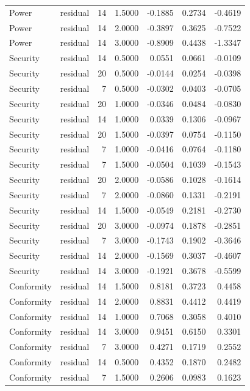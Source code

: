 \begin{tabular}{llrrrrr}
Power & residual & 14 & 1.5000 & -0.1885 & 0.2734 & -0.4619 \\
Power & residual & 14 & 2.0000 & -0.3897 & 0.3625 & -0.7522 \\
Power & residual & 14 & 3.0000 & -0.8909 & 0.4438 & -1.3347 \\
Security & residual & 14 & 0.5000 & 0.0551 & 0.0661 & -0.0109 \\
Security & residual & 20 & 0.5000 & -0.0144 & 0.0254 & -0.0398 \\
Security & residual & 7 & 0.5000 & -0.0302 & 0.0403 & -0.0705 \\
Security & residual & 20 & 1.0000 & -0.0346 & 0.0484 & -0.0830 \\
Security & residual & 14 & 1.0000 & 0.0339 & 0.1306 & -0.0967 \\
Security & residual & 20 & 1.5000 & -0.0397 & 0.0754 & -0.1150 \\
Security & residual & 7 & 1.0000 & -0.0416 & 0.0764 & -0.1180 \\
Security & residual & 7 & 1.5000 & -0.0504 & 0.1039 & -0.1543 \\
Security & residual & 20 & 2.0000 & -0.0586 & 0.1028 & -0.1614 \\
Security & residual & 7 & 2.0000 & -0.0860 & 0.1331 & -0.2191 \\
Security & residual & 14 & 1.5000 & -0.0549 & 0.2181 & -0.2730 \\
Security & residual & 20 & 3.0000 & -0.0974 & 0.1878 & -0.2851 \\
Security & residual & 7 & 3.0000 & -0.1743 & 0.1902 & -0.3646 \\
Security & residual & 14 & 2.0000 & -0.1569 & 0.3037 & -0.4607 \\
Security & residual & 14 & 3.0000 & -0.1921 & 0.3678 & -0.5599 \\
Conformity & residual & 14 & 1.5000 & 0.8181 & 0.3723 & 0.4458 \\
Conformity & residual & 14 & 2.0000 & 0.8831 & 0.4412 & 0.4419 \\
Conformity & residual & 14 & 1.0000 & 0.7068 & 0.3058 & 0.4010 \\
Conformity & residual & 14 & 3.0000 & 0.9451 & 0.6150 & 0.3301 \\
Conformity & residual & 7 & 3.0000 & 0.4271 & 0.1719 & 0.2552 \\
Conformity & residual & 14 & 0.5000 & 0.4352 & 0.1870 & 0.2482 \\
Conformity & residual & 7 & 1.5000 & 0.2606 & 0.0983 & 0.1623 \\

\end{tabular}
